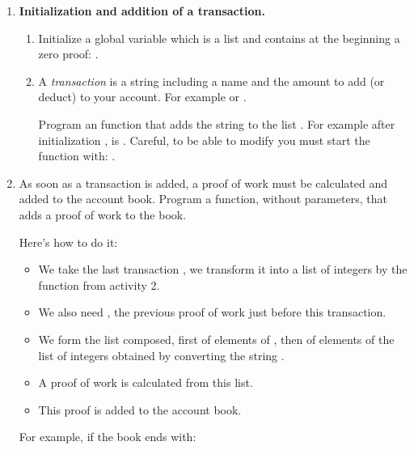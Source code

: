 \documentclass[11pt,class=report,crop=false]{standalone}
\begin{document}
\begin{activite}




\begin{enumerate}
  \item \textbf{Initialization and addition of a transaction.}
  
  \begin{enumerate}
    \item Initialize a global  variable which is a list and contains at the beginning a zero proof:  .
  
    \item A \emph{transaction} is a string including a name and the amount to add (or deduct) to your account. For example  or .
    
    Program an  function that adds the string  to the list . 
For example after initialization ,  
     is \ci{[ [0,0,0,0,0,0], "Camille +100" ]}.
    Careful, to be able to modify  you must start the function with: .
    
  \end{enumerate} 
  
   \item As soon as a transaction is added, a proof of work must be calculated and added to the account book. Program a  function, without parameters, that adds a proof of work to the book.   
   
Here's how to do it:
  \begin{itemize}
    \item We take the last transaction , we transform it into a list of integers by the  function from activity 2.
    \item We also need , the previous proof of work just before this transaction.
    \item We form the  list composed, first of elements of , then of elements of the list of integers obtained by converting the string .
    \item A proof of work is calculated from this list.
    \item This proof is added to the account book.
  \end{itemize}
  For example, if the book ends with:
  

\end{enumerate}
\end{activite}
\end{document}
